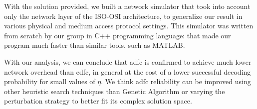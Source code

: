 \documentclass[12pt,journal,draftclsnofoot,onecolumn]{IEEEtran}
\begin{document}
With the solution provided, we built a network simulator that took into account only the network layer of the ISO-OSI architecture, to generalize our result in various physical and medium access protocol settings.
This simulator was written from scratch by our group in C++ programming language: that made our program much faster than similar tools, such as MATLAB\textregistered.

With our analysis, we can conclude that \gls{adfc} is confirmed to achieve much lower network overhead than \gls{edfc}, in general at the cost of a lower successful decoding probability for small values of $\eta$.
We think \gls{adfc} reliability can be improved using other heuristic search techniques than Genetic Algorithm or varying the perturbation strategy to better fit its complex solution space.



\end{document}
